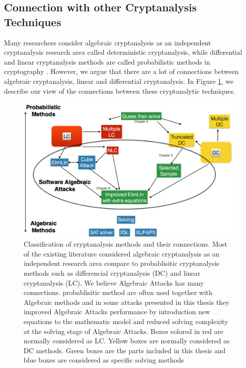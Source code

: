 \subsection{Connection with other Cryptanalysis Techniques}
Many researchers consider algebraic cryptanalysis as an independent cryptanalysis research area called deterministic cryptanalysis, while differential and linear cryptanalysis methods are called probabilistic methods in cryptography \cite{pasalic2009probabilistic}. However, we argue that there are a lot of connections between algebraic cryptanalysis, linear and differential cryptanalysis. In Figure \ref{fig:ch3general}, we describe our view of the connections between these cryptanalytic techniques.

\begin{figure}[h!]
	\centering
	\includegraphics[width=130mm]{./pics/ch3general.png}	
	\caption[Classification of cryptanalysis methods and their connections]{Classification of cryptanalysis methods and their connections. Most of the existing literature considered algebraic cryptanalysis as an independent research area compare to probablisitic cryptanalysis methods such as differencial cryptanalysis (DC) and linear cryptanalysis (LC). We believe Algebraic Attacks has many connections. probablisitic method are often used together with Algebraic methods and in some attacks presented in this thesis they improved Algebraic Attacks performance by introduction new equations to the mathematic model and reduced solving complexity at the solving stage of Algebraic Attacks. Boxes colored in red are normally considered as LC. Yellow boxes are normally considered as DC methods. Green boxes are the parts included in this thesis and blue boxes are considered as specific solving methods}
	\label{fig:ch3general}
\end{figure}	

